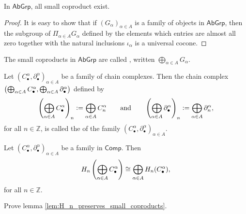 \begin{proposition}
	In $\mathsf{AbGrp}$, all small coproduct exist.
\end{proposition}

\begin{proof}
	It is easy to show that if $(G_\alpha)_{\alpha \in A}$ is a family of objects in $\mathsf{AbGrp}$, then the subgroup of $\Pi_{\alpha \in A} G_\alpha$ defined by the elements which entries are almost all zero together with the natural inclusions $\iota_\alpha$ is a universal cocone.
\end{proof}

\begin{definition}
	The small coproducts in $\mathsf{AbGrp}$ are called , written $\bigoplus_{\alpha \in A}G_\alpha$.
\end{definition}

\begin{definition}
	Let $(C^\alpha_\bullet,\partial_\bullet^\alpha)_{\alpha \in A}$ be a family of chain complexes. Then the chain complex $\del[1]{\bigoplus_{\alpha \in A}C^\alpha_\bullet, \bigoplus_{\alpha \in A}\partial^\alpha_\bullet}$ defined by
	\begin{equation*}
		\del[4]{\bigoplus_{\alpha \in A}C_\bullet^\alpha}_n := \bigoplus_{\alpha \in A} C_n^\alpha \qquad \text{and} \qquad \del[4]{\bigoplus_{\alpha \in A}\partial_\bullet^\alpha}_n := \bigoplus_{\alpha \in A}\partial_n^\alpha, 
	\end{equation*}
	\noindent for all $n \in \mathbb{Z}$, is called the  of the family $(C_\bullet^\alpha,\partial_\bullet^\alpha)_{\alpha \in A}$.
\end{definition}

\begin{lemma}
	\label{lem:H_n_preserves_small_coproducts}
	Let $(C_\bullet^\alpha,\partial_\bullet^\alpha)_{\alpha \in A}$ be a family in $\mathsf{Comp}$. Then
	\begin{equation*}
		H_n\del[4]{\bigoplus_{\alpha \in A}C_\bullet^\alpha} \cong \bigoplus_{\alpha \in A}H_n(C_\bullet^\alpha),
	\end{equation*}
	\noindent for all $n \in \mathbb{Z}$.
\end{lemma}

\begin{exercise}
	Prove lemma \ref{lem:H_n_preserves_small_coproducts}.
\end{exercise}

